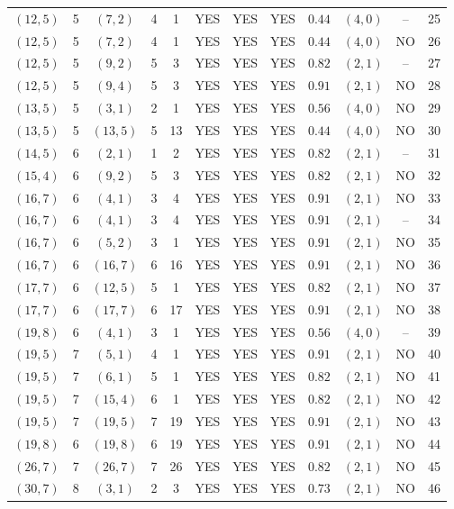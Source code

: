\begin{longtable}{|c|c|c|c|c|c|c|c|c|c|c|c|}
$(12,5)$ & 5 & $(7,2)$ & 4 & 1 & YES & YES & YES & $0.44$ & $(4,0)$ & -- & 25\\
$(12,5)$ & 5 & $(7,2)$ & 4 & 1 & YES & YES & YES & $0.44$ & $(4,0)$ & NO & 26\\
$(12,5)$ & 5 & $(9,2)$ & 5 & 3 & YES & YES & YES & $0.82$ & $(2,1)$ & -- & 27\\
$(12,5)$ & 5 & $(9,4)$ & 5 & 3 & YES & YES & YES & $0.91$ & $(2,1)$ & NO & 28\\
$(13,5)$ & 5 & $(3,1)$ & 2 & 1 & YES & YES & YES & $0.56$ & $(4,0)$ & NO & 29\\
$(13,5)$ & 5 & $(13,5)$ & 5 & 13 & YES & YES & YES & $0.44$ & $(4,0)$ & NO & 30\\
$(14,5)$ & 6 & $(2,1)$ & 1 & 2 & YES & YES & YES & $0.82$ & $(2,1)$ & -- & 31\\
$(15,4)$ & 6 & $(9,2)$ & 5 & 3 & YES & YES & YES & $0.82$ & $(2,1)$ & NO & 32\\
$(16,7)$ & 6 & $(4,1)$ & 3 & 4 & YES & YES & YES & $0.91$ & $(2,1)$ & NO & 33\\
$(16,7)$ & 6 & $(4,1)$ & 3 & 4 & YES & YES & YES & $0.91$ & $(2,1)$ & -- & 34\\
$(16,7)$ & 6 & $(5,2)$ & 3 & 1 & YES & YES & YES & $0.91$ & $(2,1)$ & NO & 35\\
$(16,7)$ & 6 & $(16,7)$ & 6 & 16 & YES & YES & YES & $0.91$ & $(2,1)$ & NO & 36\\
$(17,7)$ & 6 & $(12,5)$ & 5 & 1 & YES & YES & YES & $0.82$ & $(2,1)$ & NO & 37\\
$(17,7)$ & 6 & $(17,7)$ & 6 & 17 & YES & YES & YES & $0.91$ & $(2,1)$ & NO & 38\\
$(19,8)$ & 6 & $(4,1)$ & 3 & 1 & YES & YES & YES & $0.56$ & $(4,0)$ & -- & 39\\
$(19,5)$ & 7 & $(5,1)$ & 4 & 1 & YES & YES & YES & $0.91$ & $(2,1)$ & NO & 40\\
$(19,5)$ & 7 & $(6,1)$ & 5 & 1 & YES & YES & YES & $0.82$ & $(2,1)$ & NO & 41\\
$(19,5)$ & 7 & $(15,4)$ & 6 & 1 & YES & YES & YES & $0.82$ & $(2,1)$ & NO & 42\\
$(19,5)$ & 7 & $(19,5)$ & 7 & 19 & YES & YES & YES & $0.91$ & $(2,1)$ & NO & 43\\
$(19,8)$ & 6 & $(19,8)$ & 6 & 19 & YES & YES & YES & $0.91$ & $(2,1)$ & NO & 44\\
$(26,7)$ & 7 & $(26,7)$ & 7 & 26 & YES & YES & YES & $0.82$ & $(2,1)$ & NO & 45\\
$(30,7)$ & 8 & $(3,1)$ & 2 & 3 & YES & YES & YES & $0.73$ & $(2,1)$ & NO & 46\\

\end{longtable}
